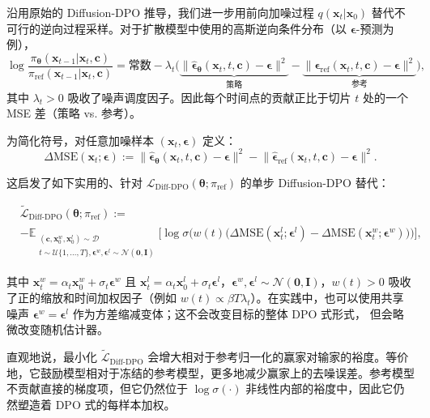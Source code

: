 沿用原始的 Diffusion-DPO 推导，我们进一步用前向加噪过程 $q(\mathbf x_t|\mathbf x_0)$ 替代不可行的逆向过程采样。对于扩散模型中使用的高斯逆向条件分布（以 $\boldsymbol\epsilon$-预测为例），
\[
\log\frac{\pi_{\bm\theta}(\mathbf x_{t-1}| \mathbf x_t,\mathbf c)}{\pi_{\mathrm{ref}}(\mathbf x_{t-1}| \mathbf x_t,\mathbf c)}
= \text{常数}
-\lambda_t \Big(\underbrace{\big\|\hat{\boldsymbol\epsilon}_{\bm\theta}(\mathbf x_t,t,\mathbf c)-\boldsymbol\epsilon\big\|^2}_{\mathrm{策略}}
-\underbrace{\big\|\hat{\boldsymbol\epsilon}_{\mathrm{ref}}(\mathbf x_t,t,\mathbf c)-\boldsymbol\epsilon\big\|^2}_{\mathrm{参考}}\Big),
\]
其中 $\lambda_t>0$ 吸收了噪声调度因子。因此每个时间点的贡献正比于切片 $t$ 处的一个 MSE 差（策略 vs. 参考）。

为简化符号，对任意加噪样本 $(\mathbf x_t,\boldsymbol\epsilon)$ 定义：
\[
\Delta\mathrm{MSE}(\mathbf x_t;\boldsymbol\epsilon)
:= \big\|\hat{\boldsymbol\epsilon}_{\bm\theta}(\mathbf x_t,t,\mathbf c)-\boldsymbol\epsilon\big\|^2
 - \big\|\hat{\boldsymbol\epsilon}_{\mathrm{ref}}(\mathbf x_t,t,\mathbf c)-\boldsymbol\epsilon\big\|^2.
\]

这启发了如下实用的、针对 $\mathcal L_{\mathrm{Diff\text{-}DPO}}(\bm\theta;\pi_{\mathrm{ref}})$ 的单步 Diffusion-DPO 替代：
\begin{mdframed}
\begin{align*}
    &\tilde{\mathcal L}_{\mathrm{Diff\text{-}DPO}}(\bm\theta;\pi_{\mathrm{ref}})
    :=
    \\&-\mathbb E_{\substack{(\mathbf c,\mathbf x_0^w,\mathbf x_0^l)\sim\mathcal D\\
    t\sim\mathcal U\{1,\dots,T\}, \boldsymbol\epsilon^w,\boldsymbol\epsilon^l\sim\mathcal N(\mathbf 0,\mathbf I)}}
    \Big[
    \log\sigma\!\Big(
    w(t)\big(\Delta\mathrm{MSE}(\mathbf x_t^l;\boldsymbol\epsilon^l)-\Delta\mathrm{MSE}(\mathbf x_t^w;\boldsymbol\epsilon^w)\big)
    \Big)
    \Big],
\end{align*}
\end{mdframed}
其中 $\mathbf x_t^w=\alpha_t \mathbf x_0^w+\sigma_t \boldsymbol\epsilon^w$ 且 $\mathbf x_t^l=\alpha_t \mathbf x_0^l+\sigma_t \boldsymbol\epsilon^l$，$\boldsymbol\epsilon^w,\boldsymbol\epsilon^l\sim\mathcal N(\mathbf 0,\mathbf I)$，$w(t)>0$ 吸收了正的缩放和时间加权因子（例如 $w(t)\propto \beta T \lambda_t$）。在实践中，也可以使用共享噪声 $\boldsymbol\epsilon^w=\boldsymbol\epsilon^l$
作为方差缩减变体；这不会改变目标的整体 DPO 式形式，
但会略微改变随机估计器。

直观地说，最小化 $\tilde{\mathcal L}_{\mathrm{Diff\text{-}DPO}}$ 会增大相对于参考归一化的赢家对输家的裕度。等价地，它鼓励模型相对于冻结的参考模型，更多地减少赢家上的去噪误差。参考模型不贡献直接的梯度项，但它仍然位于 $\log\sigma(\cdot)$ 非线性内部的裕度中，因此它仍然塑造着 DPO 式的每样本加权。


